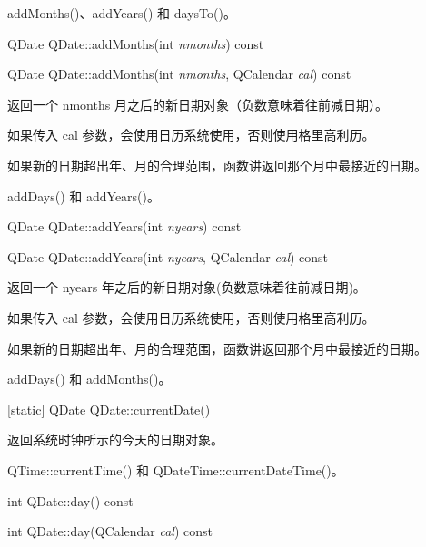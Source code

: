 \begin{notice}[另请参阅]
addMonths()、addYears() 和 daysTo()。
\end{notice}

\splitLine

QDate QDate::addMonths(int \emph{nmonths}) const

QDate QDate::addMonths(int \emph{nmonths}, QCalendar \emph{cal}) const

返回一个 nmonths 月之后的新日期对象（负数意味着往前减日期）。

如果传入 cal 参数，会使用日历系统使用，否则使用格里高利历。


\begin{notice}
如果新的日期超出年、月的合理范围，函数讲返回那个月中最接近的日期。
\end{notice}

\begin{notice}[另请参阅]
addDays() 和 addYears()。
\end{notice}

\splitLine

QDate QDate::addYears(int \emph{nyears}) const

QDate QDate::addYears(int \emph{nyears}, QCalendar \emph{cal}) const

返回一个 nyears 年之后的新日期对象(负数意味着往前减日期)。

如果传入 cal 参数，会使用日历系统使用，否则使用格里高利历。



\begin{notice}
如果新的日期超出年、月的合理范围，函数讲返回那个月中最接近的日期。
\end{notice}

\begin{notice}[另请参阅]
addDays() 和 addMonths()。
\end{notice}


\splitLine

[static] QDate QDate::currentDate()

返回系统时钟所示的今天的日期对象。



\begin{notice}[另请参阅]
QTime::currentTime() 和 QDateTime::currentDateTime()。
\end{notice}

\splitLine

int QDate::day() const

int QDate::day(QCalendar \emph{cal}) const

